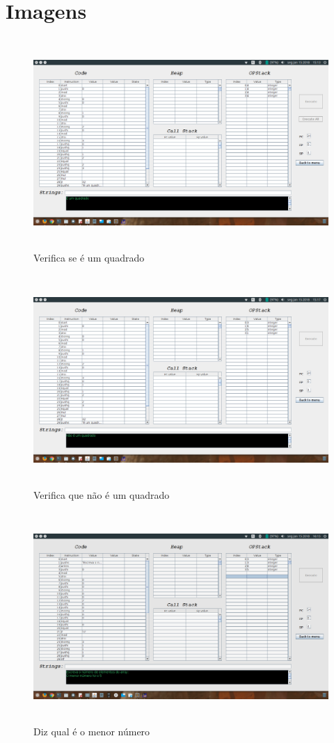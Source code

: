 \documentclass{report}
\begin{document}
\appendix
\chapter{Imagens}

\begin{figure}[h]
	\centering
	\includegraphics[width=14cm,height= 8cm]{exemplo1-1.png}
	\caption{Verifica se é um quadrado}
	\label{Exemplo 1.1}
\end{figure}

\begin{figure}[h]
	\centering
	\includegraphics[width=14cm,height= 8cm]{exemplo1-2.png}
	\caption{Verifica que não é um quadrado}
	\label{Exemplo 1.2}
\end{figure}

\begin{figure}[h]
	\centering
	\includegraphics[width=14cm,height= 8cm]{exemplo2-1.png}
	\caption{Diz qual é o menor número}
	\label{Exemplo 2.1}
\end{figure}
\end{document}
